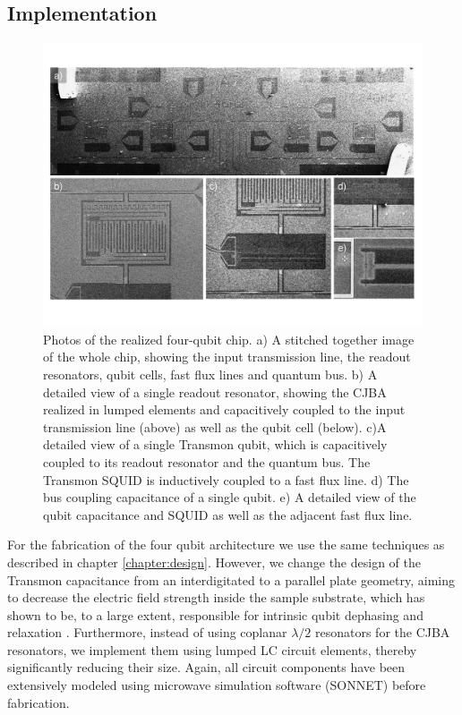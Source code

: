 \subsection{Implementation}

\begin{figure}[ht!]
	\centering
	\includegraphics[width=\textwidth]{./material/figures/scalable-architecture/scalable_architecture_photos}
	\caption[]{Photos of the realized four-qubit chip. a) A stitched together image of the whole chip, showing the input transmission line, the readout resonators, qubit cells, fast flux lines and quantum bus. b) A detailed view of a single readout resonator, showing the CJBA realized in lumped elements and capacitively coupled to the input transmission line (above) as well as the qubit cell (below). c)A detailed view of a single Transmon qubit, which is capacitively coupled to its readout resonator and the quantum bus. The Transmon SQUID is inductively coupled to a fast flux line. d) The bus coupling capacitance of a single qubit. e) A detailed view of the qubit capacitance and SQUID as well as the adjacent fast flux line.}
	\label{fig:scalable_architecture_photos}
\end{figure}

For the fabrication of the four qubit architecture we use the same techniques as described in chapter \ref{chapter:design}. However, we change the design of the Transmon capacitance from an interdigitated to a parallel plate geometry, aiming to decrease the electric field strength inside the sample substrate, which has shown to be, to a large extent, responsible for intrinsic qubit dephasing and relaxation \citep{paik_observation_2011}. Furthermore, instead of using coplanar $\lambda/2$ resonators for the CJBA resonators, we implement them using lumped LC circuit elements, thereby significantly reducing their size. Again, all circuit components have been extensively modeled using microwave simulation software (SONNET) before fabrication.

